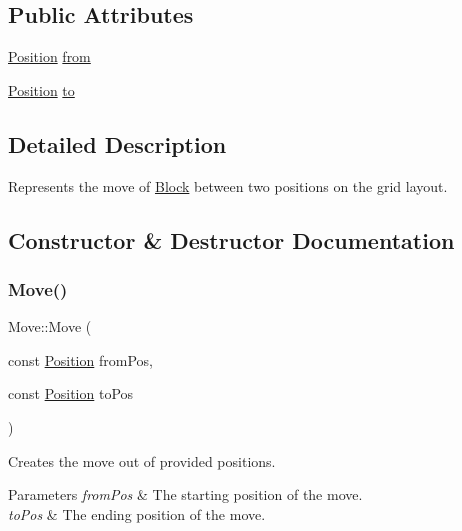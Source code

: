 \subsection*{Public Attributes}
\begin{DoxyCompactItemize}
\item 
\mbox{\hyperlink{struct_position}{Position}} \mbox{\hyperlink{struct_move_add76f7fa185380a7a02b6904bf48dc87}{from}}
\item 
\mbox{\hyperlink{struct_position}{Position}} \mbox{\hyperlink{struct_move_a6b0d3fd05bd190244015848d4a1b0aae}{to}}
\end{DoxyCompactItemize}


\subsection{Detailed Description}
Represents the move of \mbox{\hyperlink{class_block}{Block}} between two positions on the grid layout. 



\subsection{Constructor \& Destructor Documentation}
\mbox{\label{struct_move_aa27facde66c32c5f168c7779108c16a2}} 
\subsubsection{\texorpdfstring{Move()}{Move()}}
{\footnotesize\ttfamily Move\+::\+Move (\begin{DoxyParamCaption}\item[{const \mbox{\hyperlink{struct_position}{Position}}}]{from\+Pos,  }\item[{const \mbox{\hyperlink{struct_position}{Position}}}]{to\+Pos }\end{DoxyParamCaption})\hspace{0.3cm}{\ttfamily [inline]}}



Creates the move out of provided positions. 


\begin{DoxyParams}{Parameters}
{\em from\+Pos} & The starting position of the move. \\
\hline
{\em to\+Pos} & The ending position of the move. \\
\hline
\end{DoxyParams}
\mbox{\label{struct_move_a6632e48fd18a643a58bf21c6eafc06d7}} 
